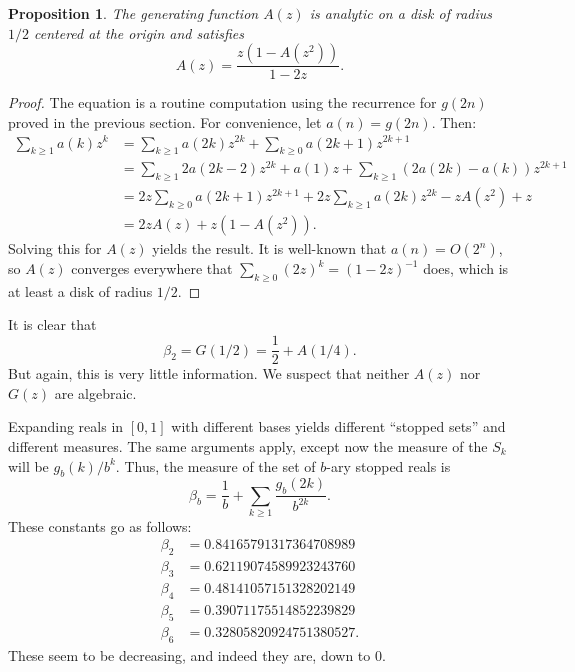 \documentclass[12pt]{amsart}
\newtheorem{proposition}{Proposition}
\theoremstyle{definition}
\begin{document}
\begin{proposition}
    The generating function $A(z)$ is analytic on a disk of radius $1 / 2$
    centered at the origin and satisfies
    \begin{equation*}
        A(z) = \frac{z(1 - A(z^2))}{1 - 2z}.
    \end{equation*}
\end{proposition}

\begin{proof}
    The equation is a routine computation using the recurrence for $g(2n)$ proved in
    the previous section. For convenience, let $a(n) = g(2n)$. Then:
    \begin{align*}
        \sum_{k \geq 1} a(k) z^k
            &= \sum_{k \geq 1} a(2k) z^{2k} + \sum_{k \geq 0} a(2k + 1) z^{2k + 1} \\
            &= \sum_{k \geq 1} 2 a(2k - 2) z^{2k} + a(1) z + \sum_{k \geq 1} (2a(2k) - a(k)) z^{2k + 1} \\
            &= 2 z \sum_{k \geq 0} a(2k + 1) z^{2k + 1} + 2 z \sum_{k \geq 1} a(2k) z^{2k} - z A(z^2) + z \\
            &= 2z A(z) + z(1 - A(z^2)).
    \end{align*}
    Solving this for $A(z)$ yields the result. It is well-known that $a(n) =
    O(2^n)$, so $A(z)$ converges everywhere that $\sum_{k \geq 0} (2z)^k = (1 -
    2z)^{-1}$ does, which is at least a disk of radius $1/2$.
\end{proof}

It is clear that
\begin{equation*}
    \beta_2 = G(1/2) =\frac{1}{2} + A(1/4).
\end{equation*}
But again, this is very little information. We suspect that neither $A(z)$ nor
$G(z)$ are algebraic.

Expanding reals in $[0, 1]$ with different bases yields different ``stopped
sets'' and different measures. The same arguments apply, except now the measure
of the $S_k$ will be $g_b(k) / b^k$. Thus, the measure of the set of $b$-ary
stopped reals is
\begin{equation*}
    \beta_b = \frac{1}{b} + \sum_{k \geq 1} \frac{g_b(2k)}{b^{2k}}.
\end{equation*}
These constants go as follows:
\begin{align*}
    \beta_2 &= 0.84165791317364708989 \\
    \beta_3 &= 0.62119074589923243760 \\
    \beta_4 &= 0.48141057151328202149 \\
    \beta_5 &= 0.39071175514852239829 \\
    \beta_6 &= 0.32805820924751380527.
\end{align*}
These seem to be decreasing, and indeed they are, down to 0.
\end{document}
